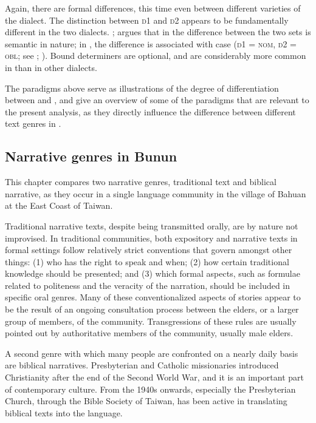 \documentclass[output=paper
,modfonts
,nonflat]{langsci/langscibook}
\begin{document}
\noindent
Again, there are formal differences, this time even between different varieties of the  dialect. The distinction between \textsc{d1} and \textsc{d2} appears to be fundamentally different in the two dialects. \citet[426--440]{DeBusser2009}; \citet{DeBusser2017} argues that in  the difference between the two sets is semantic in nature; in , the difference is associated with case (\textsc{d1} = \textsc{nom}, \textsc{d2} = \textsc{obl}; see \citealt[95]{Huang2016Bun}; \citealt[76]{Zeitoun2000}). Bound determiners are optional, and are considerably more common in  than in other dialects. 

The paradigms above serve as illustrations of the degree of differentiation between  and , and give an overview of some of the paradigms that are relevant to the present analysis, as they directly influence the difference between different text genres in .

\subsection{\label{s1.4}Narrative genres in Bunun}

This chapter compares two narrative genres, traditional  text and biblical narrative, as they occur in a single   language community in the village of Bahuan at the East Coast of Taiwan.

Traditional narrative texts, despite being transmitted orally, are by nature not improvised. In traditional  communities, both expository and narrative texts in formal settings follow relatively strict conventions that govern amongst other things: (1) who has the right to speak and when; (2) how certain traditional knowledge should be presented; and (3) which formal aspects, such as formulae related to politeness and the veracity of the narration, should be included in specific oral genres. Many of these conventionalized aspects of stories appear to be the result of an ongoing consultation process between the elders, or a larger group of members, of the community. Transgressions of these rules are usually pointed out by authoritative members of the community, usually male elders.

A second genre with which many  people are confronted on a nearly daily basis are biblical narratives. Presbyterian and Catholic missionaries introduced Christianity after the end of the Second World War, and it is an important part of contemporary  culture. From the 1940s onwards, especially the Presbyterian Church, through the Bible Society of Taiwan, has been active in translating biblical texts into the  language. 
\end{document}
